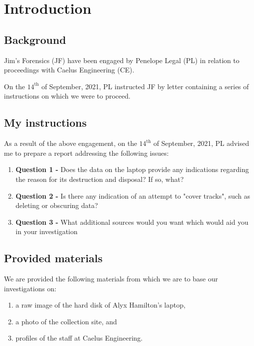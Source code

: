 \section{Introduction} %
\label{sec:introduction}

\subsection{Background} %
\label{sub:background}

\begin{myenum}
    \item Jim's Forensics (JF) have been engaged by Penelope Legal (PL) in relation to proceedings with Caelus Engineering (CE).
    \item On the $14^\text{th}$ of September, 2021, PL instructed JF by letter containing a series of instructions on which we were to proceed.
\end{myenum}


\subsection{My instructions} %
\label{sub:my_instructions}

\begin{myenum}
\item As a result of the above engagement, on the $14^\text{th}$ of September, 2021, PL advised me to prepare a report addressing the following issues:
    \begin{enumerate}
        \item \textbf{Question 1 -} Does the data on the laptop provide any indications regarding the reason for its destruction and disposal? If so, what?
        \item \textbf{Question 2 -} Is there any indication of an attempt to "cover tracks", such as deleting or obscuring data?
        \item \textbf{Question 3 - } What additional sources would you want which would aid you in your investigation
    \end{enumerate}
\end{myenum}


\subsection{Provided materials} %
\begin{myenum}
     \item We are provided the following materials from which we are to base our investigations on:
         \begin{enumerate}
            \item a raw image of the hard disk of Alyx Hamilton's laptop,
            \item a photo of the collection site, and 
            \item profiles of the staff at Caelus Engineering.
         \end{enumerate}
\end{myenum}
\label{sub:provided_materials}


